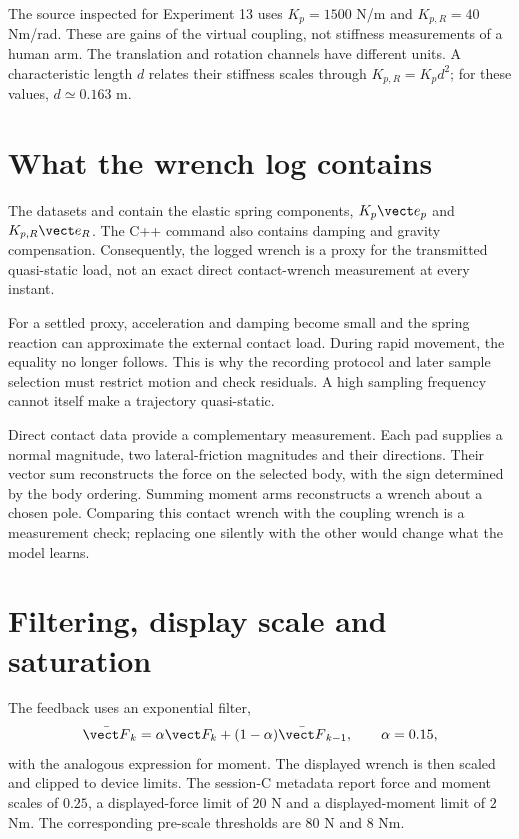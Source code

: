 The source inspected for Experiment 13 uses $K_p=1500$ N/m and $K_{p,R}=40$ Nm/rad. These are gains of the virtual coupling, not stiffness measurements of a human arm. The translation and rotation channels have different units. A characteristic length $d$ relates their stiffness scales through $K_{p,R}=K_p d^2$; for these values, $d\simeq0.163$ m.

\section{What the wrench log contains}

The datasets  and  contain the elastic spring components, $K_p\vect e_p$ and $K_{p,R}\vect e_R$. The C++ command also contains damping and gravity compensation. Consequently, the logged wrench is a proxy for the transmitted quasi-static load, not an exact direct contact-wrench measurement at every instant.

For a settled proxy, acceleration and damping become small and the spring reaction can approximate the external contact load. During rapid movement, the equality no longer follows. This is why the recording protocol and later sample selection must restrict motion and check residuals. A high sampling frequency cannot itself make a trajectory quasi-static.

Direct contact data provide a complementary measurement. Each pad supplies a normal magnitude, two lateral-friction magnitudes and their directions. Their vector sum reconstructs the force on the selected body, with the sign determined by the body ordering. Summing moment arms reconstructs a wrench about a chosen pole. Comparing this contact wrench with the coupling wrench is a measurement check; replacing one silently with the other would change what the model learns.

\section{Filtering, display scale and saturation}

The feedback uses an exponential filter,
\begin{equation}
\bar{\vect F}_k=\alpha\vect F_k+(1-\alpha)\bar{\vect F}_{k-1},
\qquad \alpha=0.15,
\end{equation}
with the analogous expression for moment. The displayed wrench is then scaled and clipped to device limits. The session-C metadata report force and moment scales of $0.25$, a displayed-force limit of $20$ N and a displayed-moment limit of $2$ Nm. The corresponding pre-scale thresholds are $80$ N and $8$ Nm.

